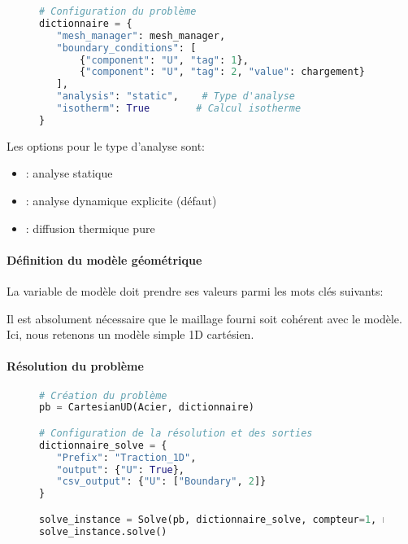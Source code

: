 \documentclass[10pt]{book}
\begin{document}
\begin{figure}[h!]
\begin{lstlisting}[language=python]
# Configuration du problème
dictionnaire = {
   "mesh_manager": mesh_manager,
   "boundary_conditions": [
       {"component": "U", "tag": 1},                          # Blocage à gauche
       {"component": "U", "tag": 2, "value": chargement}      # Déplacement imposé à droite
   ],
   "analysis": "static",    # Type d'analyse
   "isotherm": True        # Calcul isotherme
}
\end{lstlisting}
\end{figure}

Les options pour le type d'analyse sont:
\begin{itemize}
\item {}: analyse statique
\item {}: analyse dynamique explicite (défaut)
\item {}: diffusion thermique pure
\end{itemize}


\paragraph{Définition du modèle géométrique} La variable de modèle doit prendre ses valeurs parmi les mots clés suivants:



Il est absolument nécessaire que le maillage fourni soit cohérent avec le modèle. Ici, nous retenons un modèle simple 1D cartésien.

\paragraph{Résolution du problème}

\begin{figure}[h!]
\begin{lstlisting}[language=python]
# Création du problème
pb = CartesianUD(Acier, dictionnaire)

# Configuration de la résolution et des sorties
dictionnaire_solve = {
   "Prefix": "Traction_1D",
   "output": {"U": True},
   "csv_output": {"U": ["Boundary", 2]}
}

solve_instance = Solve(pb, dictionnaire_solve, compteur=1, npas=10)
solve_instance.solve()
\end{lstlisting}
\end{figure}
\end{document}
